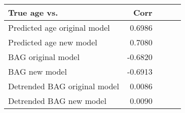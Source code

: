 \begin{tabular}{lrrrr}
\toprule
                True age vs. &    Corr \\
\midrule
Predicted age original model &  0.6986 \\
     Predicted age new model &  0.7080 \\
          BAG original model & -0.6820 \\
               BAG new model & -0.6913 \\
Detrended BAG original model &  0.0086 \\
     Detrended BAG new model &  0.0090 \\
\bottomrule
\end{tabular}
